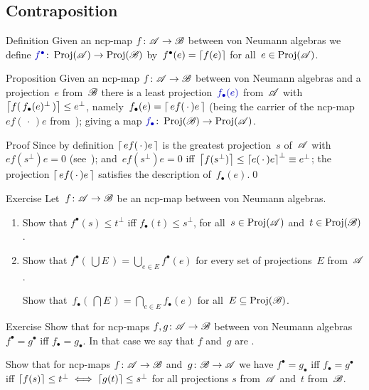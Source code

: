\documentclass[a]{subfiles}
\begin{document}
\subsection{Contraposition}
\begin{parsec}%
\begin{point}{Definition}%
Given an ncp-map $f\colon \mathscr{A}\to\mathscr{B}$
between von Neumann algebras
we define
$\Define{f^\bullet}\colon \Proj(\scrA)\to \Proj(\scrB)$
by~$f^\bullet(e)=\left\lceil f(e)\right\rceil$
for all~$e\in\operatorname{Proj}(\mathscr{A})$.
\end{point}
\begin{point}{Proposition}%
Given an ncp-map $f\colon \mathscr{A}\to\mathscr{B}$
between von Neumann algebras
and a projection~$e$ from~$\mathscr{B}$
there is a least projection~$\Define{f_\bullet(e)}$ from~$\mathscr{A}$ 
with~$\left\lceil f(\,f_\bullet(e)^\perp\,)\right\rceil\leq e^\perp$,
namely~$f_\bullet(e) =\left\lceil\,ef(\,\cdot\,)e\,\right\rceil$
(being the carrier 
of the ncp-map $ef(\,\cdot\,)e$ from~);
giving a map $\Define{f_\bullet}\colon \Proj(\scrB)\to\Proj(\scrA)$.

\begin{point}{Proof}%
Since by definition $\left\lceil\,ef(\,\cdot\,)e\,\right\rceil$
is the greatest projection~$s$ of~$\mathscr{A}$
with $ef(s^\perp)e=0$ (see~);
and~$ef(s^\perp )e=0$ iff~$\left\lceil f(s^\perp)\right\rceil
\leq\left\lceil e(\,\cdot\,)e\right\rceil^\perp\equiv
e^\perp$;
the projection
$\left\lceil\,ef(\,\cdot\,)e\,\right\rceil$
satisfies the description of~$f_\bullet(e)$.\qed
\end{point}
\end{point}
\begin{point}{Exercise}%
Let~$f\colon \mathscr{A}\to\mathscr{B}$ be an ncp-map between von Neumann algebras.
\begin{enumerate}
\item
Show that $f^\bullet(s)\leq t^\perp$
iff $f_\bullet(t)\leq s^\perp$,
for all~$s\in\operatorname{Proj}(\mathscr{A})$ and~$t\in\operatorname{Proj}(\mathscr{B})$.
\item
Show that $f^\bullet(\,\bigcup E\,)
= \bigcup_{e\in E} f^\bullet(e)$
for every set of projections~$E$ from~$\mathscr{A}$.

Show that~$f_\bullet(\,\bigcap E\,)
= \bigcap_{e\in E} f_\bullet(e)$
for all~$E\subseteq \operatorname{Proj}(\mathscr{B})$.
\end{enumerate}
\end{point}
\begin{point}{Exercise}%
Show that for ncp-maps $f,g\colon\mathscr{A}\to\mathscr{B}$
between von Neumann algebras $f^\bullet = g^\bullet$
iff $f_\bullet = g_\bullet$.
In that case we say that $f$ and~$g$ are .
\begin{point}%
Show that for ncp-maps $f\colon \mathscr{A}\to\mathscr{B}$
and~$g\colon \mathscr{B}\to\mathscr{A}$ we have
$f^\bullet=g_\bullet$ iff $f_\bullet = g^\bullet$
iff $\left\lceil f(s)\right\rceil\leq t^\perp\iff \left\lceil g(t)\right\rceil\leq s^\perp$
for all projections $s$ from~$\mathscr{A}$ and~$t$ from~$\mathscr{B}$.


\end{point}
\end{point}
\end{parsec}
\end{document}
